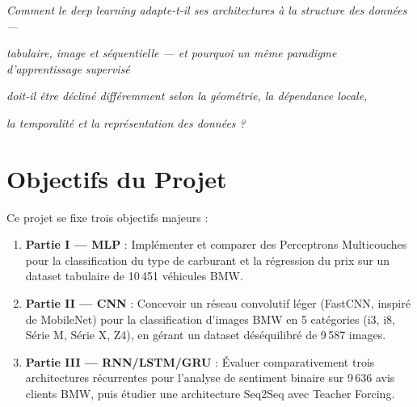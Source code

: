 \documentclass[12pt,a4paper]{report}
\begin{document}
\vspace{0.2cm}
\begin{infobox}
\begin{center}
\large
\textit{Comment le deep learning adapte-t-il ses architectures à la structure des données —}
\par\large
\textit{tabulaire, image et séquentielle — et pourquoi un même paradigme d'apprentissage supervisé}
\par\large
\textit{doit-il être décliné différemment selon la géométrie, la dépendance locale,}
\par\large
\textit{la temporalité et la représentation des données ?}
\end{center}
\end{infobox}

\section*{Objectifs du Projet}

Ce projet se fixe trois objectifs majeurs :
\begin{enumerate}[leftmargin=*,nosep]
    \item \textbf{Partie I --- MLP} : Implémenter et comparer des Perceptrons Multicouches pour 
          la classification du type de carburant et la régression du prix sur un dataset 
          tabulaire de 10\,451 véhicules BMW.
    \item \textbf{Partie II --- CNN} : Concevoir un réseau convolutif léger (FastCNN, inspiré de 
          MobileNet) pour la classification d'images BMW en 5 catégories (i3, i8, Série M, 
          Série X, Z4), en gérant un dataset déséquilibré de 9\,587 images.
    \item \textbf{Partie III --- RNN/LSTM/GRU} : Évaluer comparativement trois architectures 
          récurrentes pour l'analyse de sentiment binaire sur 9\,636 avis clients BMW, 
          puis étudier une architecture Seq2Seq avec Teacher Forcing.
\end{enumerate}
\end{document}
